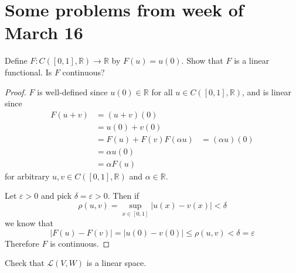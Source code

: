 \section{Some problems from week of March 16}
\begin{prob}
    Define $F : C([0,1], \mathbb R) \to \mathbb R$ by 
    $F(u) = u(0)$. Show that $F$ is a linear functional. 
    Is $F$ continuous?
\end{prob}
\begin{proof}
    $F$ is well-defined since $u(0) \in \mathbb R$ for all 
    $u \in C([0,1], \mathbb R)$, and is linear since 
    \begin{align*}
        F(u+v) &= (u+v)(0) \\ 
               &= u(0) + v(0) \\ 
               &= F(u) + F(v)
        F(\alpha u) &= (\alpha u)(0) \\ 
                    &= \alpha u(0) \\ 
                    &= \alpha F(u)
    \end{align*}
    for arbitrary $u,v \in C([0,1],\mathbb R)$ and 
    $\alpha \in \mathbb R$.

    Let $\varepsilon > 0$ and pick $\delta = \varepsilon > 0$. 
    Then if 
    \[
        \rho(u,v) = \sup_{x\in[0,1]}|u(x)-v(x)| < \delta
    \]
    we know that 
    \[
        |F(u)-F(v)| = |u(0) - v(0)| \leq \rho(u,v) < \delta =  
        \varepsilon 
    \]
    Therefore $F$ is continuous.
\end{proof}
\begin{prob}
    Check that $\mathcal L(V,W)$ is a linear space.
\end{prob}
